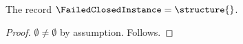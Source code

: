 

\begin{instance}\label{failed_closed_instance}
    The record $\FailedClosedInstance=\structure{}$.
\end{instance}
\begin{proof}
    $\emptyset\neq\emptyset$ by assumption.
    Follows.
\end{proof}
